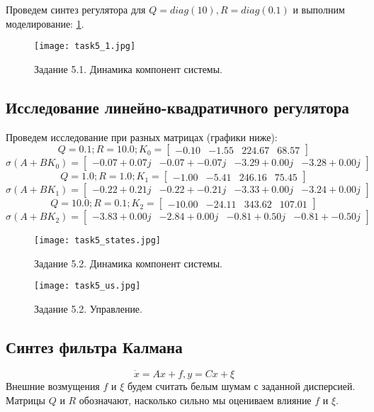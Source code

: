 Проведем синтез регулятора для $Q = diag(10), R=diag(0.1)$ и выполним моделирование: \ref{fig:task5_1}.
\begin{figure}[]
    \centering
    \texttt{[image: task5\_1.jpg]}
    \caption{Задание 5.1. Динамика компонент системы.}
    \label{fig:task5_1}
\end{figure}

\subsection{Исследование линейно-квадратичного регулятора}
Проведем исследование при разных матрицах (графики ниже):
\[Q = 0.1; R = 10.0; K_0 = \begin{bmatrix}
    -0.10 & -1.55 &  224.67 &  68.57
   \end{bmatrix}\]
   \[\sigma(A+BK_0) = \begin{bmatrix}
    -0.07 + 0.07j & -0.07 + -0.07j & -3.29 + 0.00j & -3.28 + 0.00j
   \end{bmatrix}\]
   \[Q = 1.0; R = 1.0; K_1 = \begin{bmatrix}
    -1.00 & -5.41 &  246.16 &  75.45
   \end{bmatrix}\]
   \[\sigma(A+BK_1) = \begin{bmatrix}
    -0.22 + 0.21j & -0.22 + -0.21j & -3.33 + 0.00j & -3.24 + 0.00j
   \end{bmatrix}\]
   \[Q = 10.0; R = 0.1; K_2 = \begin{bmatrix}
    -10.00 & -24.11 &  343.62 &  107.01
   \end{bmatrix}\]
   \[\sigma(A+BK_2) = \begin{bmatrix}
    -3.83 + 0.00j & -2.84 + 0.00j & -0.81 + 0.50j & -0.81 + -0.50j
   \end{bmatrix}\]

\begin{figure}[]
        \centering
        \texttt{[image: task5\_states.jpg]}
        \caption{Задание 5.2. Динамика компонент системы.}
        \label{fig:task5_states}
\end{figure}

\begin{figure}[]
        \centering
        \texttt{[image: task5\_us.jpg]}
        \caption{Задание 5.2. Управление.}
        \label{fig:task5_u}
\end{figure}


\subsection{Синтез фильтра Калмана}
\begin{equation}
    \dot{x} = Ax + f, y = Cx + \xi
\end{equation}
Внешние возмущения $f$ и $\xi$  будем считать белым шумам с заданной дисперсией.
Матрицы \(Q\) и \(R\) обозначают, насколько сильно мы оцениваем влияние \(f\) и \(\xi\).

